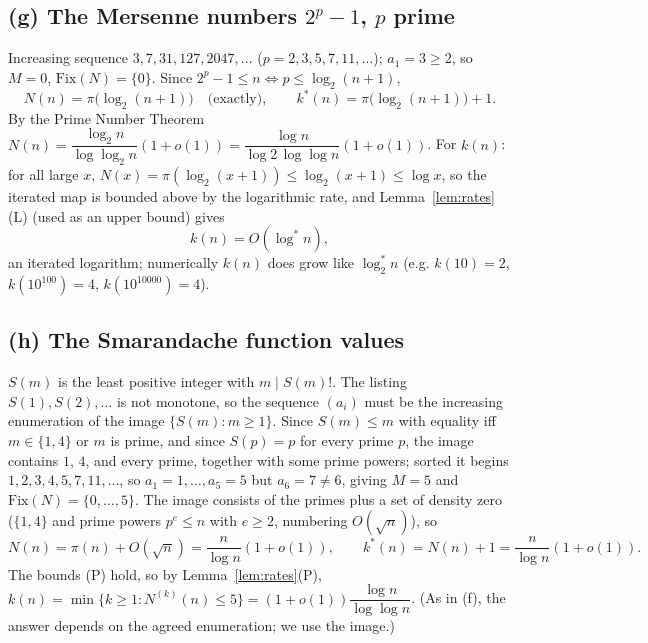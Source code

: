 \documentclass[12pt]{article}
\theoremstyle{definition}
\begin{document}
\subsection{(g) The Mersenne numbers $2^p-1$, $p$ prime}
Increasing sequence $3,7,31,127,2047,\dots$ ($p=2,3,5,7,11,\dots$); $a_1=3\ge2$, so
$M=0$, $\mathrm{Fix}(N)=\{0\}$. Since $2^p-1\le n\iff p\le\log_2(n+1)$,
\[
  N(n)=\pi\bigl(\log_2(n+1)\bigr)\quad\text{(exactly)},\qquad
  k^*(n)=\pi\bigl(\log_2(n+1)\bigr)+1.
\]
By the Prime Number Theorem $N(n)=\dfrac{\log_2 n}{\log\log_2 n}(1+o(1))
=\dfrac{\log n}{\log2\,\log\log n}(1+o(1))$. For $k(n)$: for all large $x$,
$N(x)=\pi(\log_2(x+1))\le\log_2(x+1)\le\log x$, so the iterated map is bounded above
by the logarithmic rate, and Lemma~\ref{lem:rates}(L) (used as an upper bound) gives
\[
  k(n)=O(\log^* n),
\]
an iterated logarithm; numerically $k(n)$ does grow like $\log^*_2 n$ (e.g.
$k(10)=2$, $k(10^{100})=4$, $k(10^{10000})=4$).

\subsection{(h) The Smarandache function values}
$S(m)$ is the least positive integer with $m\mid S(m)!$. The listing $S(1),S(2),\dots$
is not monotone, so the sequence $(a_i)$ must be the increasing enumeration of the
image $\{S(m):m\ge1\}$. Since $S(m)\le m$ with equality iff $m\in\{1,4\}$ or $m$ is
prime, and since $S(p)=p$ for every prime $p$, the image contains $1$, $4$, and every
prime, together with some prime powers; sorted it begins $1,2,3,4,5,7,11,\dots$, so
$a_1=1,\dots,a_5=5$ but $a_6=7\ne6$, giving $M=5$ and $\mathrm{Fix}(N)=\{0,\dots,5\}$.
The image consists of the primes plus a set of density zero ($\{1,4\}$ and prime
powers $p^e\le n$ with $e\ge2$, numbering $O(\sqrt n)$), so
\[
  N(n)=\pi(n)+O(\sqrt n)=\frac{n}{\log n}(1+o(1)),\qquad
  k^*(n)=N(n)+1=\frac{n}{\log n}(1+o(1)).
\]
The bounds (P) hold, so by Lemma~\ref{lem:rates}(P),
$k(n)=\min\{k\ge1:N^{(k)}(n)\le5\}=(1+o(1))\dfrac{\log n}{\log\log n}$. (As in (f),
the answer depends on the agreed enumeration; we use the image.)
\end{document}
